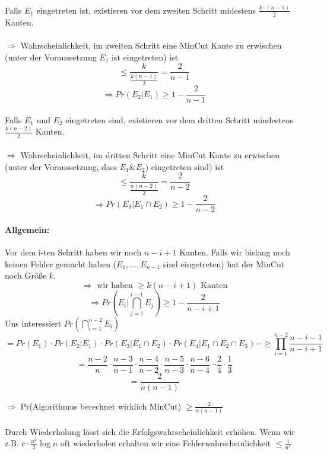 \paragraph*{} Falls $E_1$ eingetreten ist, existieren vor dem zweiten Schritt midestens $\frac{k \cdot (n-1)}{2}$ Kanten.
\paragraph*{} $\Rightarrow$ Wahrscheinlichkeit, im zweiten Schritt eine MinCut Kante zu erwischen (unter der Voraussetzung $E_1$ ist eingetreten) ist
$$ \leq \frac{k}{\frac{k(n-1)}{2}} = \frac{2}{n-1}$$
$$ \Rightarrow Pr(E_2|E_1) \geq 1 - \frac{2}{n-1} $$
\paragraph*{} Falls $E_1$ und $E_2$ eingetreten sind, existieren vor dem dritten Schritt mindestens $\frac{k(n-2)}{2}$ Kanten.
\paragraph*{} $\Rightarrow$ Wahrscheinlichkeit, im dritten Schritt eine MinCut Kante zu erwischen (unter der Voraussetzung, dass $E_1 \& E_2$) eingetreten sind) ist
$$ \leq \frac{k}{\frac{n(n-2)}{2}} = \frac{2}{n-2} $$
$$ \Rightarrow Pr(E_3|E_1 \cap E_2) \geq 1 - \frac{2}{n-2} $$

\paragraph*{Allgemein:} Vor dem i-ten Schritt haben wir noch $n-i+1$ Kanten. Falls wir bislang  noch keinen Fehler gemacht haben ($E_1,\dots, E_{n-1}$ sind eingetreten) hat der MinCut noch Größe $k$.
$$ \Rightarrow \text{ wir haben } \geq k(n-i+1) \text{ Kanten} $$
$$ \Rightarrow Pr(E_i|\bigcap_{j=1}^{i-1} E_j) \geq 1-\frac{2}{n-i+1} $$
Uns interessiert $Pr(\bigcap\limits_{i=1}^{n-2} E_i)$
$$ = Pr(E_1) \cdot Pr(E_2|E_1) \cdot Pr(E_3|E_1 \cap E_2) \cdot Pr(E_4|E_1 \cap E_2 \cap E_3) \cdots \geq \prod\limits_{i=1}^{n-2} \frac{n-i-1}{n-i+1} $$
$$ = \frac{n-2}{n} \cdot \frac{n-3}{n-1} \cdot \frac{n-4}{n-2} \cdot \frac{n-5}{n-3} \cdot \frac{n-6}{n-4} \cdots \frac{2}{4} \cdot \frac{1}{3} $$
$$ = \frac{2}{n(n-1)} $$

$\Rightarrow$ Pr(Algorithmus berechnet wirklich MinCut) $\geq \frac{2}{n(n-1)}$
\paragraph*{}
 Durch Wiederholung lässt sich die Erfolgswahrscheinlichkeit erhöhen. Wenn wir z.B. $c \cdot \frac{n^2}{2} \log n$ oft wiederholen erhalten wir eine Fehlerwahrscheinlichkeit $\leq \frac{1}{n^c}$ %
